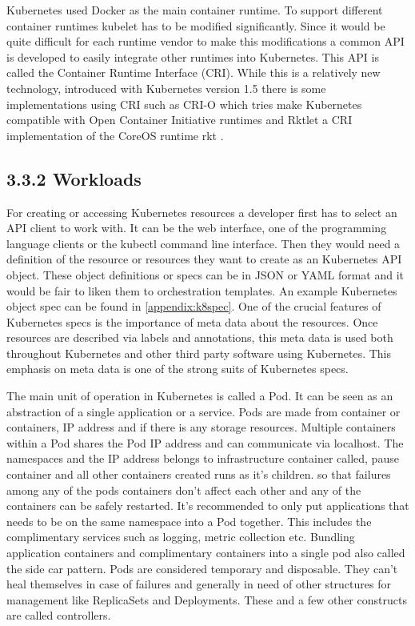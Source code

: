 \documentclass[12pt,oneandhalf,chaparabic,ceng,ms,eng,oneside,pntc]{gsufbe}
\begin{document}
Kubernetes used Docker as the main container runtime.  To support different container runtimes kubelet
has to be modified significantly.  Since it would be quite difficult for each runtime vendor to make
this modifications a common API is developed to easily integrate other runtimes into Kubernetes.  This
API is called the Container Runtime Interface (CRI).  While this is a relatively new technology,
introduced with Kubernetes version 1.5 there is some implementations using CRI such as CRI-O \cite{crio} which
tries make Kubernetes compatible with Open Container Initiative runtimes and Rktlet a CRI
implementation of the CoreOS runtime rkt \cite{rkt}.

\subsection[Workloads]{3.3.2 Workloads}
For creating or accessing Kubernetes resources a developer first has to select an API client to work
with.  It can be the web interface, one of the programming language clients or the kubectl command line
interface.  Then they would need a definition of the resource or resources they want to create as an
Kubernetes API object.  These object definitions or specs can be in JSON or YAML format and it would be
fair to liken them to orchestration templates.  An example Kubernetes object spec can be found in
\ref{appendix:k8spec}.  One of the crucial features of Kubernetes specs is the importance of meta data
about the resources.
Once resources are described via labels and annotations, this meta data is used both throughout 
Kubernetes and other third party software using Kubernetes. This emphasis on meta data is one of the strong
suits of Kubernetes specs.

The main unit of operation in Kubernetes is called a Pod.  It can be seen as an abstraction of a single
application or a service.  Pods are made from container or containers, IP address and if there is any
storage resources.  Multiple containers within a Pod shares the Pod IP address and can communicate via
localhost.  The namespaces and the IP address belongs to infrastructure container called, pause 
container and all other containers created runs as it’s children.  so that failures among any of the 
pods containers don't affect each other and any of the containers can be safely restarted.  
\cite{sayfan_mastering_2018} It's 
recommended to only put applications that needs to be on the same namespace into a Pod together.  This
includes the complimentary services such as logging, metric collection etc. Bundling application
containers and complimentary containers into a single pod also called the side car pattern.  Pods are
considered temporary and disposable.  They can’t heal themselves in case of failures and generally in
need of other structures for management like ReplicaSets and Deployments.  These and a few other
constructs are called controllers.
\end{document}
